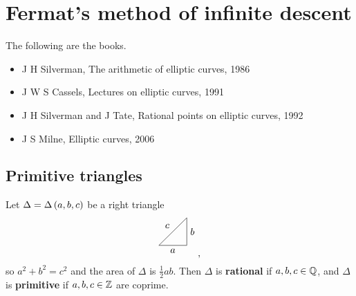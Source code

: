 \def\module{Elliptic Curves}
\def\lecturer{Prof Tom Fisher}
\def\term{Michaelmas 2020}
\def\cover{}
\def\syllabus{}
\def\thm{section}



\newcommand{\rational}[5][]{
  \ifx &#1&
    \begin{array}{rcl}
      #2 & \dashrightarrow & #3 \\
      #4 & \longmapsto     & #5
    \end{array}
  \else
    \begin{array}{ccrcl}
      #1 & : & #2 & \dashrightarrow & #3 \\
         &   & #4 & \longmapsto     & #5
    \end{array}
  \fi
}





\setcounter{section}{0}

\section{Fermat's method of infinite descent}


The following are the books.
\begin{itemize}
\item J H Silverman, The arithmetic of elliptic curves, 1986
\item J W S Cassels, Lectures on elliptic curves, 1991
\item J H Silverman and J Tate, Rational points on elliptic curves, 1992
\item J S Milne, Elliptic curves, 2006
\end{itemize}

\subsection{Primitive triangles}

\begin{definition*}
Let $ \Delta = \Delta\br{a, b, c} $ be a right triangle
$$
\begin{tikzpicture}
\draw (0, 0) to node[below]{$ a $} (-1, 0);
\draw (0, 0) to node[right]{$ b $} (0, 1);
\draw (-1, 0) to node[above left]{$ c $} (0, 1);
\end{tikzpicture},
$$
so $ a^2 + b^2 = c^2 $ and the area of $ \Delta $ is $ \tfrac{1}{2}ab $. Then $ \Delta $ is \textbf{rational} if $ a, b, c \in \mathbb{Q} $, and $ \Delta $ is \textbf{primitive} if $ a, b, c \in \mathbb{Z} $ are coprime.
\end{definition*}

